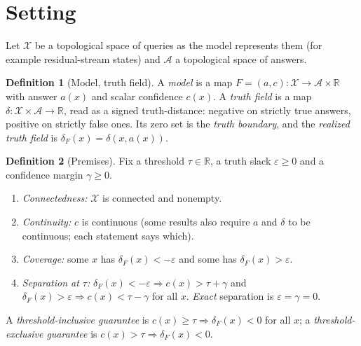 \documentclass[10pt]{article}
\theoremstyle{definition}
\newtheorem{definition}{Definition}
\theoremstyle{remark}
\newcommand{\X}{\mathcal{X}}
\newcommand{\A}{\mathcal{A}}
\newcommand{\R}{\mathbb{R}}
\newcommand{\conf}{c}
\newcommand{\dF}{\delta_{\!F}}
\begin{document}
\section{Setting}
\label{sec:setting}

Let $\X$ be a topological space of queries as the model represents them
(for example residual-stream states) and $\A$ a topological space of
answers.

\begin{definition}[Model, truth field]
\label{def:model}
A \emph{model} is a map $F=(a,\conf):\X\to\A\times\R$ with answer $a(x)$
and scalar confidence $\conf(x)$. A \emph{truth field} is a map
$\delta:\X\times\A\to\R$, read as a signed truth-distance: negative on
strictly true answers, positive on strictly false ones. Its zero set is
the \emph{truth boundary}, and the \emph{realized truth field} is
$\dF(x)=\delta(x,a(x))$.
\end{definition}

\begin{definition}[Premises]
\label{def:premises}
Fix a threshold $\tau\in\R$, a truth slack $\varepsilon\ge 0$ and a
confidence margin $\gamma\ge 0$.
\begin{enumerate}[label=(\textbf{\Alph*}),leftmargin=*,itemsep=1pt,topsep=2pt]
\item[(T)] \emph{Connectedness:} $\X$ is connected and nonempty.
\item[(C)] \emph{Continuity:} $\conf$ is continuous (some results also
require $a$ and $\delta$ to be continuous; each statement says which).
\item[(Cov$_\varepsilon$)] \emph{Coverage:} some $x$ has
$\dF(x)<-\varepsilon$ and some has $\dF(x)>\varepsilon$.
\item[(Sep$_{\varepsilon,\gamma}$)] \emph{Separation at $\tau$:}
$\dF(x)<-\varepsilon\Rightarrow\conf(x)>\tau+\gamma$ and
$\dF(x)>\varepsilon\Rightarrow\conf(x)<\tau-\gamma$ for all $x$.
\emph{Exact} separation is $\varepsilon=\gamma=0$.
\end{enumerate}
A \emph{threshold-inclusive guarantee} is
$\conf(x)\ge\tau\Rightarrow\dF(x)<0$ for all $x$; a
\emph{threshold-exclusive guarantee} is $\conf(x)>\tau\Rightarrow\dF(x)<0$.
\end{definition}
\end{document}
